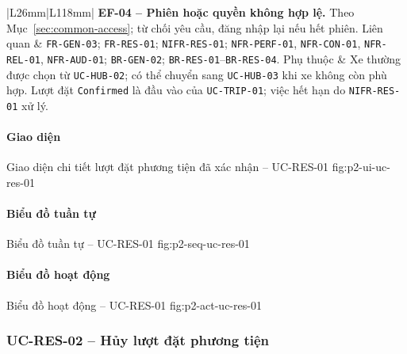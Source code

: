 \begin{longtable}{|L{26mm}|L{118mm}|}
    \textbf{EF-04 -- Phiên hoặc quyền không hợp lệ.} Theo Mục~\ref{sec:common-access}; từ chối yêu cầu, đăng nhập lại nếu hết phiên.\KeepUseCaseRow
  Liên quan & \texttt{FR-GEN-03}; \texttt{FR-RES-01}; \texttt{NIFR-RES-01}; \texttt{NFR-PERF-01}, \texttt{NFR-CON-01}, \texttt{NFR-REL-01}, \texttt{NFR-AUD-01}; \texttt{BR-GEN-02}; \texttt{BR-RES-01}--\texttt{BR-RES-04}.\KeepUseCaseRow
  Phụ thuộc & Xe thường được chọn từ \texttt{UC-HUB-02}; có thể chuyển sang \texttt{UC-HUB-03} khi xe không còn phù hợp. Lượt đặt \texttt{Confirmed} là đầu vào của \texttt{UC-TRIP-01}; việc hết hạn do \texttt{NIFR-RES-01} xử lý.\\\hline
\end{longtable}
\normalsize

\par\medskip
\noindent\begin{minipage}{\linewidth}
\paragraph{Giao diện}
  {Giao diện chi tiết lượt đặt phương tiện đã xác nhận -- UC-RES-01}
  {fig:p2-ui-uc-res-01}
  {}
\end{minipage}\par

\clearpage
\paragraph{Biểu đồ tuần tự}
  {Biểu đồ tuần tự -- UC-RES-01}
  {fig:p2-seq-uc-res-01}

\clearpage
\paragraph{Biểu đồ hoạt động}
  {Biểu đồ hoạt động -- UC-RES-01}
  {fig:p2-act-uc-res-01}

\clearpage

\subsubsection{UC-RES-02 -- Hủy lượt đặt phương tiện}


